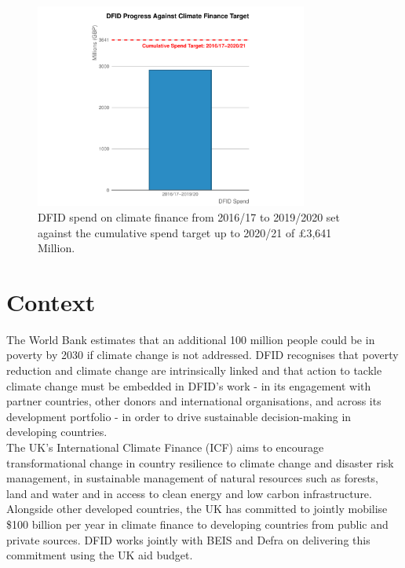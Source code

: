 \begin{figure}[htbp]
  \centering
\begin{knitrout}
\color{fgcolor}
\includegraphics[width=0.8\textwidth]{figs/climate_spend_plot-1} 

\end{knitrout}
  \caption{DFID spend on climate finance from 2016/17 to 2019/2020 set against the cumulative spend target up to 2020/21 of \pounds 3,641 Million.}
  \label{fig:climate_spend_plot}
\end{figure}


\section{Context}

The World Bank estimates that an additional 100 million people could be in poverty by 2030 if climate change is not addressed. %
DFID recognises that poverty reduction and climate change are intrinsically linked and that action to tackle climate change must be embedded in DFID's work - in its engagement with partner countries, other donors and international organisations, and across its development portfolio - in order to drive sustainable decision-making in developing countries. \\%

The UK's International Climate Finance (ICF) aims to encourage transformational change in country resilience to climate change and disaster risk management, in sustainable management of natural resources such as forests, land and water and in access to clean energy and low carbon infrastructure. %
Alongside other developed countries, the UK has committed to jointly mobilise \$100 billion per year in climate finance to developing countries from public and private sources. %
DFID works jointly with BEIS and Defra on delivering this commitment using the UK aid budget. %

